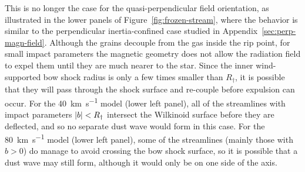 This is no longer the case for the quasi-perpendicular field
orientation, as illustrated in the lower panels of
Figure~\ref{fig:frozen-stream}, where the behavior is similar to the
perpendicular inertia-confined case studied in
Appendix~\ref{sec:perp-magn-field}.  Although the grains decouple from
the gas inside the rip point, for small impact parameters the magnetic
geometry does not allow the radiation field to expel them until they
are much nearer to the star.  Since the inner wind-supported bow shock
radius is only a few times smaller than \(R_\dag\), it is possible that
they will pass through the shock surface and re-couple before
expulsion can occur.  For the \SI{40}{km.s^{-1}} model (lower left
panel), all of the streamlines with impact parameters
\(\lvert b\rvert < R_\dag\) intersect the Wilkinoid surface before they are
deflected, and so no separate dust wave would form in this case.  For
the \SI{80}{km.s^{-1}} model (lower left panel), some of the
streamlines (mainly those with \(b > 0\)) do manage to avoid crossing
the bow shock surface, so it is possible that a dust wave may still
form, although it would only be on one side of the axis.


